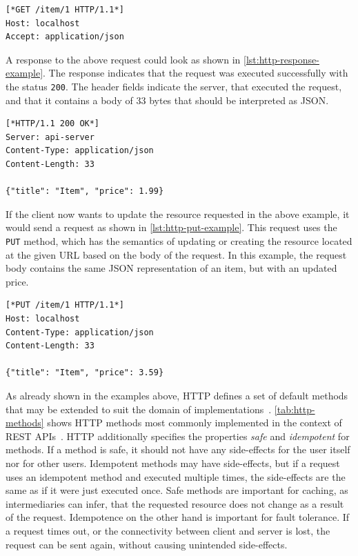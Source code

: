 \begin{lstlisting}[caption={\acs{HTTP} GET Request}, showlines=true, label=lst:http-get-example, language=http]
[*GET /item/1 HTTP/1.1*]
Host: localhost
Accept: application/json

\end{lstlisting}

A response to the above request could look as shown in \autoref{lst:http-response-example}.
The response indicates that the request was executed successfully with the status \texttt{200}.
The header fields indicate the server, that executed the request, and that it contains a body of 33 bytes that should be interpreted as \ac{JSON}.

\begin{lstlisting}[caption={\acs{HTTP} Response to GET Request}, label=lst:http-response-example, language=http]
[*HTTP/1.1 200 OK*]
Server: api-server
Content-Type: application/json
Content-Length: 33

{"title": "Item", "price": 1.99}
\end{lstlisting}

If the client now wants to update the resource requested in the above example, it would send a request as shown in \autoref{lst:http-put-example}.
This request uses the \texttt{PUT} method, which has the semantics of updating or creating the resource located at the given \ac{URL} based on the body of the request.
In this example, the request body contains the same \ac{JSON} representation of an item, but with an updated price.

\begin{lstlisting}[caption={\acs{HTTP} PUT Request}, label=lst:http-put-example, language=http]
[*PUT /item/1 HTTP/1.1*]
Host: localhost
Content-Type: application/json
Content-Length: 33

{"title": "Item", "price": 3.59}
\end{lstlisting}

As already shown in the examples above, \ac{HTTP} defines a set of default methods that may be extended to suit the domain of implementations~\cite{RFC2068}.
\autoref{tab:http-methods} shows \ac{HTTP} methods most commonly implemented in the context of \ac{REST} \acp{API}~\cite{Buelthoff2019}.
\ac{HTTP} additionally specifies the properties \textit{safe} and \textit{idempotent} for methods.
If a method is safe, it should not have any side-effects for the user itself nor for other users.
Idempotent methods may have side-effects, but if a request uses an idempotent method and executed multiple times, the side-effects are the same as if it were just executed once.
Safe methods are important for caching, as intermediaries can infer, that the requested resource does not change as a result of the request.
Idempotence on the other hand is important for fault tolerance.
If a request times out, or the connectivity between client and server is lost, the request can be sent again, without causing unintended side-effects.

